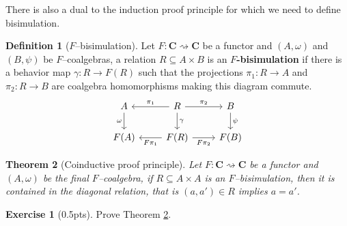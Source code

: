 \documentclass{article}
\newtheorem{thm}{Theorem}
\theoremstyle{definition}
\newtheorem{defn}[thm]{Definition}
\newtheorem{exer}{Exercise}
\theoremstyle{remark}
\begin{document}
There is also a dual to the induction proof principle for which we need to define bisimulation.
\begin{defn}[$F$--bisimulation]
	Let $F:\mathbf{C}\rightsquigarrow \mathbf{C}$ be a functor and $(A,\omega)$ and $(B, \psi)$ be $F$--coalgebras, a relation $R \subseteq A \times B$ is an $F$\textbf{-bisimulation} if there is a behavior map $\gamma:R \rightarrow F(R)$ such that the projections $\pi_1:R\rightarrow A$ and $\pi_2:R \rightarrow B$ are coalgebra homomorphisms making this diagram commute.
	\begin{equation}\label{diag-mergedef}
		\centering
		\begin{tikzcd}
			A \arrow[d, "\omega"'] & R \arrow[d, "\gamma"] \arrow[l, "\pi_1"'] \arrow[r, "\pi_2"] & B \arrow[d, "\psi"] \\
			F(A)                         & F(R) \arrow[r, "F\pi_2"'] \arrow[l, "F\pi_1"]                          & F(B)                      
		\end{tikzcd}
	\end{equation}
\end{defn}

\begin{thm}[Coinductive proof principle]\label{thm-coind} Let $F:\mathbf{C}\rightsquigarrow \mathbf{C}$ be a functor and $(A, \omega)$ be the final $F$--coalgebra, if $R\subseteq A\times A$ is an $F$--bisimulation, then it is contained in the diagonal relation, that is $(a,a') \in R$ implies $a = a'$.
\end{thm}
\begin{exer}[0.5pts]
    Prove Theorem \ref{thm-coind}.
\end{exer}
\end{document}
